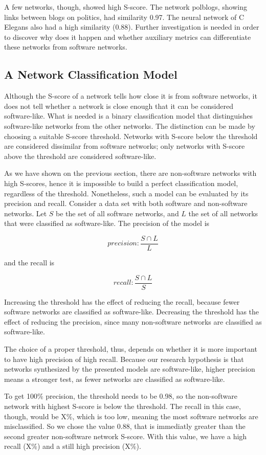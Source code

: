 A few networks, though, showed high S-score. The network
polblogs, showing links between blogs on politics, had similarity 0.97. The
neural network of C Elegans also had a high similarity (0.88). Further
investigation is needed in order to discover why does it happen and whether
auxiliary metrics can differentiate these networks from software networks.

\subsection{A Network Classification Model}

Although the S-score of a network tells how close it is from software networks,
it does not tell whether a network is close enough that it can be considered
software-like. What is needed is a binary classification model that
distinguishes software-like networks from the other networks. The distinction
can be made by choosing a suitable S-score threshold. Networks with S-score
below the threshold are considered dissimilar from software networks; only
networks with S-score above the threshold are considered software-like. 

As we have shown on the previous section, there are non-software networks with
high S-scores, hence it is impossible to build a perfect classification model,
regardless of the threshold. Nonetheless, such a model can be evaluated by its
precision and recall. Consider a data set with both software and non-software
networks. Let $S$ be the set of all software networks, and $L$ the set of all
networks that were classified as software-like. The precision of the model is

$$
precision: \frac{S \cap L}{L}
$$

and the recall is

$$
recall: \frac{S \cap L}{S}
$$

Increasing the threshold has the effect of reducing the recall, because fewer
software networks are classified as software-like. Decreasing the threshold has
the effect of reducing the precision, since many non-software networks are
classified as software-like. 

The choice of a proper threshold, thus, depends on whether it is more important
to have high precision of high recall. Because our research hypothesis is that
networks synthesized by the presented models are software-like, higher precision
means a stronger test, as fewer networks are classified as software-like.

To get 100\% precision, the threshold needs to be 0.98, so the non-software
network with highest S-score is below the threshold. The recall in this case,
though, would be X\%, which is too low, meaning the most software networks are
misclassified. So we chose the value 0.88, that is immediatly greater than the second greater
non-software network S-score. With this value, we have a high recall (X\%) and a
still high precision (X\%).

